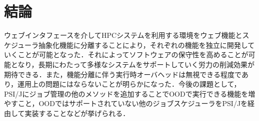 \documentclass[a4paper,oneside,twocolumn,notitlepage,dvipdfmx]{jsarticle}
\begin{document}
\section{結論}
ウェブインタフェースを介してHPCシステムを利用する環境をウェブ機能とスケジューラ抽象化機能に分離することにより，それぞれの機能を独立に開発していくことが可能となった．それによってソフトウェアの保守性を高めることが可能となり，長期にわたって多様なシステムをサポートしていく労力の削減効果が期待できる．また，機能分離に伴う実行時オーバヘッドは無視できる程度であり，運用上の問題にはならないことが明らかになった．今後の課題として，PSI/Jにジョブ管理の他のメソッドを追加することでOODで実行できる機能を増やすこと，OODではサポートされていない他のジョブスケジューラをPSI/Jを経由して実装することなどが挙げられる．\par





\end{document}
